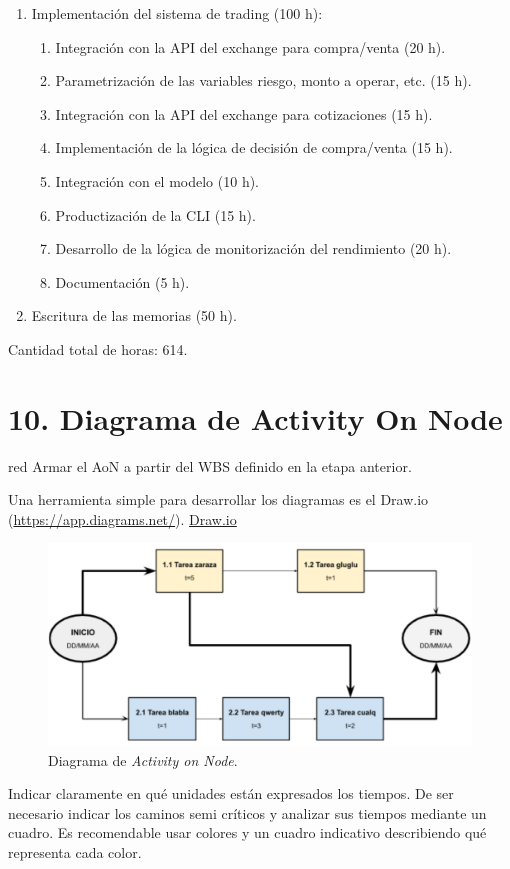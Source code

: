 \documentclass[
    11pt, %
]{charter}
\begin{document}
\begin{enumerate}
    \item Implementación del sistema de trading (100 h):
      \begin{enumerate}
      \item Integración con la API del exchange para compra/venta (20 h).
      \item Parametrización de las variables riesgo, monto a operar, etc. (15 h).
      \item Integración con la API del exchange para cotizaciones (15 h).
      \item Implementación de la lógica de decisión de compra/venta (15 h).
      \item Integración con el modelo (10 h).
      \item Productización de la CLI (15 h).
      \item Desarrollo de la lógica de monitorización del rendimiento (20 h).
      \item Documentación (5 h).
      \end{enumerate}

    \item Escritura de las memorias (50 h).
    \end{enumerate}

    Cantidad total de horas: 614.
    \section{10. Diagrama de Activity On Node}
    \label{sec:AoN}

    \begin{consigna}{red}
        Armar el AoN a partir del WBS definido en la etapa anterior.

        Una herramienta simple para desarrollar los diagramas es el Draw.io (\url{https://app.diagrams.net/}).
        \href{https://app.diagrams.net}{Draw.io}


        \begin{figure}[htpb]
            \centering
            \includegraphics[width=.8\textwidth]{./Figuras/AoN.png}
            \caption{Diagrama de \textit{Activity on Node}.}
            \label{fig:AoN}
        \end{figure}

        Indicar claramente en qué unidades están expresados los tiempos.
        De ser necesario indicar los caminos semi críticos y analizar sus tiempos mediante un cuadro.
        Es recomendable usar colores y un cuadro indicativo describiendo qué representa cada color.

    \end{consigna}
\end{document}
